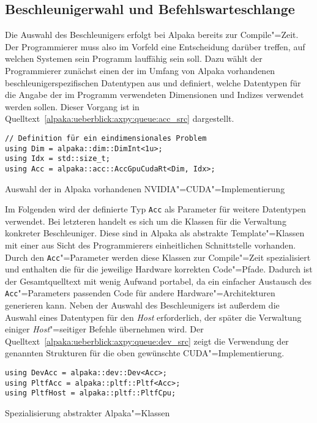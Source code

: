 \subsection{Beschleunigerwahl und Befehlswarteschlange}
\label{alpaka:ueberblick:axpy:queue}

Die Auswahl des Beschleunigers erfolgt bei Alpaka bereits zur Compile"=Zeit. Der
Programmierer muss also im Vorfeld eine Entscheidung darüber treffen, auf
welchen Systemen sein Programm lauffähig sein soll. Dazu wählt der Programmierer
zunächst einen der im Umfang von Alpaka vorhandenen beschleunigerspezifischen
Datentypen aus und definiert, welche Datentypen für die Angabe der im Programm
verwendeten Dimensionen und Indizes verwendet werden sollen. Dieser Vorgang ist
in Quelltext~\ref{alpaka:ueberblick:axpy:queue:acc_src} dargestellt.

\begin{code}
    \begin{verbatim}
// Definition für ein eindimensionales Problem
using Dim = alpaka::dim::DimInt<1u>;
using Idx = std::size_t;
using Acc = alpaka::acc::AccGpuCudaRt<Dim, Idx>;
    \end{verbatim}
    \caption{Auswahl der in Alpaka vorhandenen NVIDIA"=CUDA"=Implementierung}
    \label{alpaka:ueberblick:axpy:queue:acc_src}
\end{code}

Im Folgenden wird der definierte Typ \texttt{Acc} als Parameter für weitere
Datentypen verwendet. Bei letzteren handelt es sich um die Klassen für die
Verwaltung konkreter Beschleuniger. Diese sind in Alpaka als abstrakte
Template"=Klassen mit einer aus Sicht des Programmierers einheitlichen
Schnittstelle vorhanden. Durch den \texttt{Acc}"=Parameter werden diese Klassen
zur Compile"=Zeit spezialisiert und enthalten die für die jeweilige Hardware
korrekten Code"=Pfade. Dadurch ist der Gesamtquelltext mit wenig Aufwand
portabel, da ein einfacher Austausch des \texttt{Acc}"=Parameters passenden Code
für andere Hardware"=Architekturen generieren kann. Neben der Auswahl des
Beschleunigers ist außerdem die Auswahl eines Datentypen für den
\textit{Host} erforderlich, der später die Verwaltung einiger
\textit{Host}"=seitiger Befehle übernehmen wird. Der
Quelltext~\ref{alpaka:ueberblick:axpy:queue:dev_src} zeigt die Verwendung der
genannten Strukturen für die oben gewünschte CUDA"=Implementierung.

\begin{code}
    \begin{verbatim}
using DevAcc = alpaka::dev::Dev<Acc>;
using PltfAcc = alpaka::pltf::Pltf<Acc>;
using PltfHost = alpaka::pltf::PltfCpu;
    \end{verbatim}
    \caption{Spezialisierung abstrakter Alpaka"=Klassen}
    \label{alpaka:ueberblick:axpy:queue:dev_src}
\end{code}

